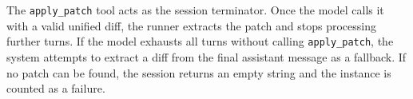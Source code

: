 The \texttt{apply\_patch} tool acts as the session terminator. Once the model calls it with a valid unified diff, the runner extracts the patch and stops processing further turns. If the model exhausts all turns without calling \texttt{apply\_patch}, the system attempts to extract a diff from the final assistant message as a fallback. If no patch can be found, the session returns an empty string and the instance is counted as a failure.
